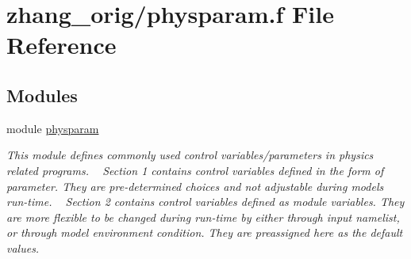 \hypertarget{physparam_8f}{}\section{zhang\+\_\+orig/physparam.f File Reference}
\label{physparam_8f}
\subsection*{Modules}
\begin{DoxyCompactItemize}
\item 
module \hyperlink{namespacephysparam}{physparam}
\begin{DoxyCompactList}\small\item\em This module defines commonly used control variables/parameters in physics related programs. ~\newline
 Section 1 contains control variables defined in the form of parameter. They are pre-\/determined choices and not adjustable during model\textquotesingle{}s run-\/time. ~\newline
 Section 2 contains control variables defined as module variables. They are more flexible to be changed during run-\/time by either through input namelist, or through model environment condition. They are preassigned here as the default values. \end{DoxyCompactList}\end{DoxyCompactItemize}
